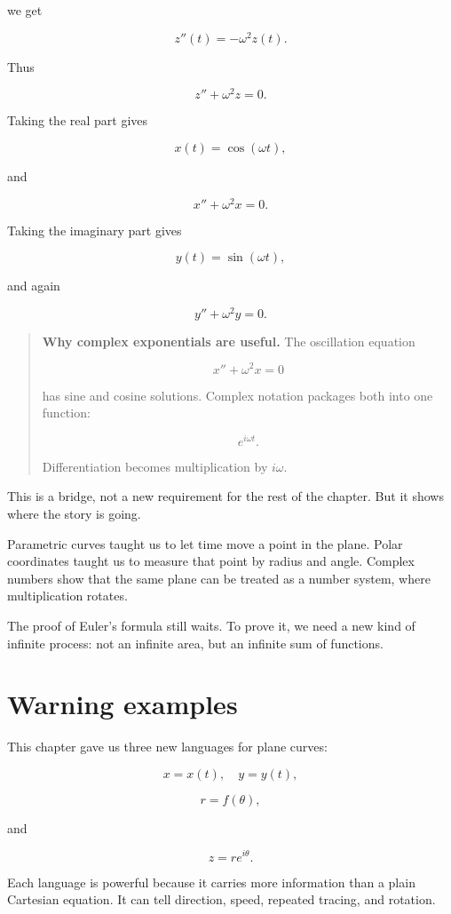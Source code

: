 we get

\[
\boxed{
z''(t)=-\omega^2 z(t).
}
\]

Thus

\[
z''+\omega^2z=0.
\]

Taking the real part gives

\[
x(t)=\cos(\omega t),
\]

and

\[
x''+\omega^2x=0.
\]

Taking the imaginary part gives

\[
y(t)=\sin(\omega t),
\]

and again

\[
y''+\omega^2y=0.
\]

\begin{quote}
\textbf{Why complex exponentials are useful.}
The oscillation equation

\[
x''+\omega^2x=0
\]

has sine and cosine solutions.  Complex notation packages both into one function:

\[
e^{i\omega t}.
\]

Differentiation becomes multiplication by \(i\omega\).
\end{quote}

This is a bridge, not a new requirement for the rest of the chapter.  But it shows where
the story is going.

Parametric curves taught us to let time move a point in the plane.  Polar coordinates
taught us to measure that point by radius and angle.  Complex numbers show that the
same plane can be treated as a number system, where multiplication rotates.

The proof of Euler's formula still waits.  To prove it, we need a new kind of infinite
process: not an infinite area, but an infinite sum of functions.
\section{Warning examples}
\label{sec:parametric-polar-warning-examples}

This chapter gave us three new languages for plane curves:

\[
x=x(t),\quad y=y(t),
\]

\[
r=f(\theta),
\]

and

\[
z=re^{i\theta}.
\]

Each language is powerful because it carries more information than a plain Cartesian
equation.  It can tell direction, speed, repeated tracing, and rotation.


